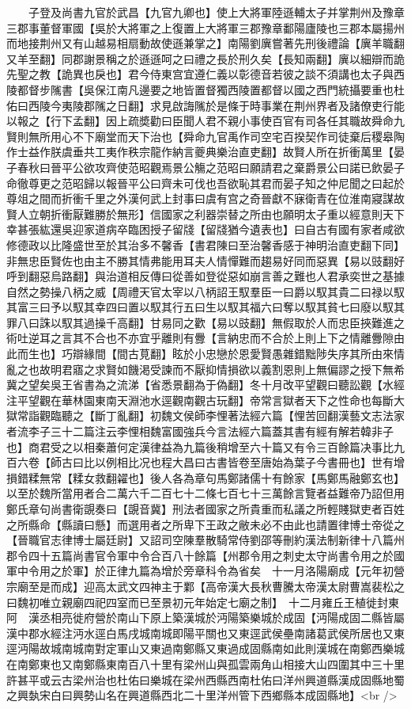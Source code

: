 　　子登及尚書九官於武昌【九官九卿也】使上大將軍陸遜輔太子并掌荆州及豫章三郡事董督軍國【吳於大將軍之上復置上大將軍三郡豫章鄱陽廬陵也三郡本屬揚州而地接荆州又有山越易相扇動故使遜兼掌之】南陽劉廙嘗著先刑後禮論【廙羊職翻又羊至翻】同郡謝景稱之於遜遜呵之曰禮之長於刑久矣【長知兩翻】廙以細辯而詭先聖之教【詭異也戾也】君今侍東宫宜遵仁義以彰德音若彼之談不須講也太子與西陵都督步隲書【吳保江南凡邊要之地皆置督獨西陵置都督以國之西門統攝要重也杜佑曰西陵今夷陵郡隲之日翻】求見啟誨隲於是條于時事業在荆州界者及諸僚吏行能以報之【行下孟翻】因上疏奬勸曰臣聞人君不親小事使百官有司各任其職故舜命九賢則無所用心不下廟堂而天下治也【舜命九官禹作司空宅百揆契作司徒棄后稷皋陶作士益作朕虞垂共工夷作秩宗龍作納言夔典樂治直吏翻】故賢人所在折衝萬里【晏子春秋曰晉平公欲攻齊使范昭觀焉景公觴之范昭曰願請君之棄爵景公曰諾已飲晏子命徹尊更之范昭歸以報晉平公曰齊未可伐也吾欲恥其君而晏子知之仲尼聞之曰起於尊俎之間而折衝千里之外漢何武上封事曰虞有宫之奇晉獻不寐衛青在位淮南寢謀故賢人立朝折衝厭難勝於無形】信國家之利器崇替之所由也願明太子重以經意則天下幸甚張紘還吳迎家道病卒臨困授子留牋【留牋猶今遺表也】曰自古有國有家者咸欲修德政以比隆盛世至於其治多不馨香【書君陳曰至治馨香感于神明治直吏翻下同】非無忠臣賢佐也由主不勝其情弗能用耳夫人情憚難而趨易好同而惡異【易以豉翻好呼到翻惡烏路翻】與治道相反傳曰從善如登從惡如崩言善之難也人君承奕世之基據自然之勢操八柄之威【周禮天官太宰以八柄詔王馭羣臣一曰爵以馭其貴二曰禄以馭其富三曰予以馭其幸四曰置以馭其行五曰生以馭其福六曰奪以馭其貧七曰廢以馭其罪八曰誅以馭其過操千高翻】甘易同之歡【易以豉翻】無假取於人而忠臣挾難進之術吐逆耳之言其不合也不亦宜乎離則有釁【言納忠而不合於上則上下之情離釁隙由此而生也】巧辯緣間【間古莧翻】眩於小忠戀於恩愛賢愚雜錯黜陟失序其所由來情亂之也故明君寤之求賢如饑渇受諫而不厭抑情損欲以義割恩則上無偏謬之授下無希冀之望矣吳王省書為之流涕【省悉景翻為于偽翻】冬十月改平望觀曰聽訟觀【水經注平望觀在華林園東南天淵池水逕觀南觀古玩翻】帝常言獄者天下之性命也每斷大獄常詣觀臨聽之【斷丁亂翻】初魏文侯師李悝著法經六篇【悝苦回翻漢藝文志法家者流李子三十二篇注云李悝相魏富國強兵今言法經六篇蓋其書有經有解若韓非子也】商君受之以相秦蕭何定漢律益為九篇後稍增至六十篇又有令三百餘篇决事比九百六卷【師古曰比以例相比况也程大昌曰古書皆卷至唐始為葉子今書冊也】世有增損錯糅無常【糅女救翻糴也】後人各為章句馬鄭諸儒十有餘家【馬鄭馬融鄭玄也】以至於魏所當用者合二萬六千二百七十二條七百七十三萬餘言覽者益難帝乃詔但用鄭氏章句尚書衛覬奏曰【覬音冀】刑法者國家之所貴重而私議之所輕賤獄吏者百姓之所縣命【縣讀曰懸】而選用者之所卑下王政之敝未必不由此也請置律博士帝從之【晉職官志律博士屬廷尉】又詔司空陳羣散騎常侍劉邵等刪約漢法制新律十八篇州郡令四十五篇尚書官令軍中令合百八十餘篇【州郡令用之刺史太守尚書令用之於國軍中令用之於軍】於正律九篇為增於旁章科令為省矣　十一月洛陽廟成【元年初營宗廟至是而成】迎高太武文四神主于鄴【高帝漢大長秋曹騰太帝漢太尉曹嵩裴松之曰魏初唯立親廟四祀四室而已至景初元年始定七廟之制】　十二月雍丘王植徙封東阿　漢丞相亮徙府營於南山下原上築漢城於沔陽築樂城於成固【沔陽成固二縣皆屬漢中郡水經注沔水逕白馬戌城南城即陽平關也又東逕武侯壘南諸葛武侯所居也又東逕沔陽故城南城南對定軍山又東過南鄭縣又東過成固縣南如此則漢城在南鄭西樂城在南鄭東也又南鄭縣東南百八十里有梁州山與孤雲兩角山相接大山四圍其中三十里許甚平或云古梁州治也杜佑曰樂城在梁州西縣西南杜佑曰洋州興道縣漢成固縣地蜀之興埶宋白曰興勢山名在興道縣西北二十里洋州管下西鄉縣本成固縣地】<br />
